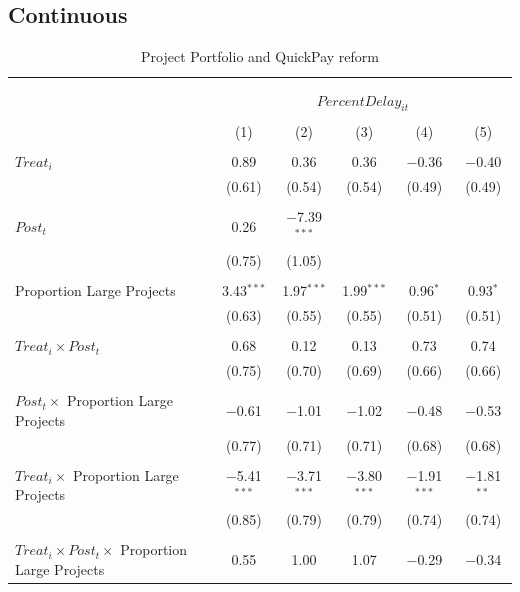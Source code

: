 \documentclass[
]{article}
\begin{document}
\hypertarget{continuous}{%
\subsection{Continuous}\label{continuous}}

\begin{table}[H] \centering 
  \caption{Project Portfolio and QuickPay reform} 
  \label{} 
\small 
\begin{tabular}{@{\extracolsep{-2pt}}lccccc} 
\\[-1.8ex]\hline 
\hline \\[-1.8ex] 
\\[-1.8ex] & \multicolumn{5}{c}{$PercentDelay_{it}$  } \\ 
\\[-1.8ex] & (1) & (2) & (3) & (4) & (5)\\ 
\hline \\[-1.8ex] 
 $Treat_i$ & 0.89 & 0.36 & 0.36 & $-$0.36 & $-$0.40 \\ 
  & (0.61) & (0.54) & (0.54) & (0.49) & (0.49) \\ 
  & & & & & \\ 
 $Post_t$ & 0.26 & $-$7.39$^{***}$ &  &  &  \\ 
  & (0.75) & (1.05) &  &  &  \\ 
  & & & & & \\ 
 Proportion Large Projects & 3.43$^{***}$ & 1.97$^{***}$ & 1.99$^{***}$ & 0.96$^{*}$ & 0.93$^{*}$ \\ 
  & (0.63) & (0.55) & (0.55) & (0.51) & (0.51) \\ 
  & & & & & \\ 
 $Treat_i \times Post_t$ & 0.68 & 0.12 & 0.13 & 0.73 & 0.74 \\ 
  & (0.75) & (0.70) & (0.69) & (0.66) & (0.66) \\ 
  & & & & & \\ 
 $Post_t \times$ Proportion Large Projects & $-$0.61 & $-$1.01 & $-$1.02 & $-$0.48 & $-$0.53 \\ 
  & (0.77) & (0.71) & (0.71) & (0.68) & (0.68) \\ 
  & & & & & \\ 
 $Treat_i \times$ Proportion Large Projects & $-$5.41$^{***}$ & $-$3.71$^{***}$ & $-$3.80$^{***}$ & $-$1.91$^{***}$ & $-$1.81$^{**}$ \\ 
  & (0.85) & (0.79) & (0.79) & (0.74) & (0.74) \\ 
  & & & & & \\ 
 $Treat_i \times Post_t \times$ Proportion Large Projects & 0.55 & 1.00 & 1.07 & $-$0.29 & $-$0.34 \\ 

\end{tabular}
\end{table}
\end{document}
